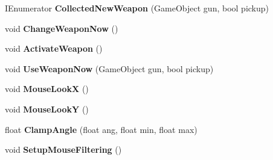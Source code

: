 \begin{DoxyCompactItemize}
\item 
\hypertarget{class_f_p_s_control_1_1_r_b_f_p_s_controller_logic_ab2c9e8bb3438d4f3e1f15329495f5409}{I\-Enumerator {\bfseries Collected\-New\-Weapon} (Game\-Object gun, bool pickup)}\label{class_f_p_s_control_1_1_r_b_f_p_s_controller_logic_ab2c9e8bb3438d4f3e1f15329495f5409}

\item 
\hypertarget{class_f_p_s_control_1_1_r_b_f_p_s_controller_logic_a24c95d66b1ef60f992bc5cbf3d32e409}{void {\bfseries Change\-Weapon\-Now} ()}\label{class_f_p_s_control_1_1_r_b_f_p_s_controller_logic_a24c95d66b1ef60f992bc5cbf3d32e409}

\item 
\hypertarget{class_f_p_s_control_1_1_r_b_f_p_s_controller_logic_a1e1db6181177f2dd4d02adfc0ac54688}{void {\bfseries Activate\-Weapon} ()}\label{class_f_p_s_control_1_1_r_b_f_p_s_controller_logic_a1e1db6181177f2dd4d02adfc0ac54688}

\item 
\hypertarget{class_f_p_s_control_1_1_r_b_f_p_s_controller_logic_a33894d1f499c2c7ae116a3102fe42ccd}{void {\bfseries Use\-Weapon\-Now} (Game\-Object gun, bool pickup)}\label{class_f_p_s_control_1_1_r_b_f_p_s_controller_logic_a33894d1f499c2c7ae116a3102fe42ccd}

\item 
\hypertarget{class_f_p_s_control_1_1_r_b_f_p_s_controller_logic_a871a12f266255e8c8d683e8c04460552}{void {\bfseries Mouse\-Look\-X} ()}\label{class_f_p_s_control_1_1_r_b_f_p_s_controller_logic_a871a12f266255e8c8d683e8c04460552}

\item 
\hypertarget{class_f_p_s_control_1_1_r_b_f_p_s_controller_logic_a85f95d8a7e46d33fbe0f480094e40ce8}{void {\bfseries Mouse\-Look\-Y} ()}\label{class_f_p_s_control_1_1_r_b_f_p_s_controller_logic_a85f95d8a7e46d33fbe0f480094e40ce8}

\item 
\hypertarget{class_f_p_s_control_1_1_r_b_f_p_s_controller_logic_abd3703a695e92e4d5907715178f9f3b8}{float {\bfseries Clamp\-Angle} (float ang, float min, float max)}\label{class_f_p_s_control_1_1_r_b_f_p_s_controller_logic_abd3703a695e92e4d5907715178f9f3b8}

\item 
\hypertarget{class_f_p_s_control_1_1_r_b_f_p_s_controller_logic_a2b37df919bdb2852277a1cd6e27307a0}{void {\bfseries Setup\-Mouse\-Filtering} ()}\label{class_f_p_s_control_1_1_r_b_f_p_s_controller_logic_a2b37df919bdb2852277a1cd6e27307a0}


\end{DoxyCompactItemize}
